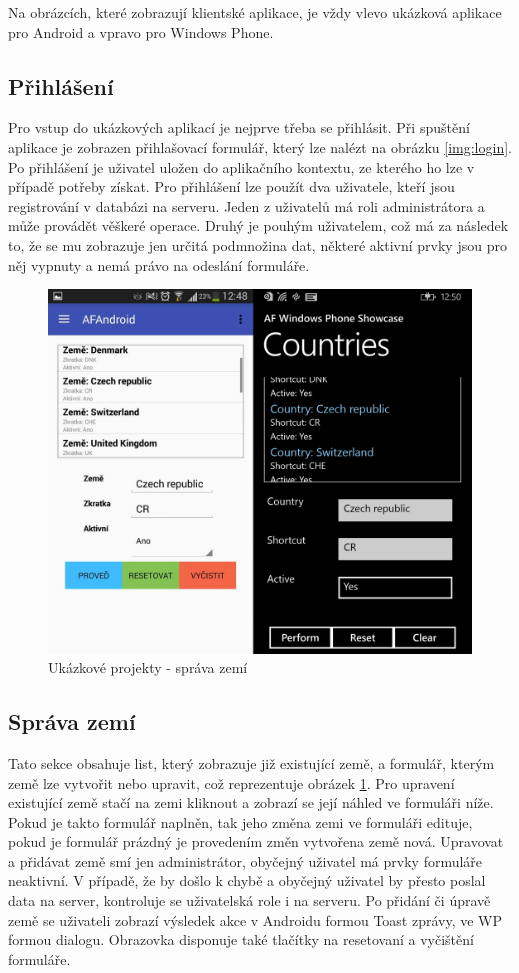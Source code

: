 Na obrázcích, které zobrazují klientské aplikace, je vždy vlevo ukázková aplikace pro Android a vpravo pro Windows Phone.

\subsection{Přihlášení}
Pro vstup do ukázkových aplikací je nejprve třeba se přihlásit. Při spuštění aplikace je zobrazen přihlašovací formulář, který lze nalézt na obrázku \ref{img:login}. Po přihlášení je uživatel uložen do aplikačního kontextu, ze kterého ho lze v případě potřeby získat. Pro přihlášení lze použít dva uživatele, kteří jsou registrování v databázi na serveru. Jeden z uživatelů má roli administrátora a může provádět věškeré operace. Druhý je pouhým uživatelem, což má za následek to, že se mu zobrazuje jen určitá podmnožina dat, některé aktivní prvky jsou pro něj vypnuty a nemá právo na odeslání formuláře.

\begin{figure}[h!]
\centering
\includegraphics[width=0.5\linewidth]{figures/screenshots/Countries}
\caption{Ukázkové projekty - správa zemí}  
\label{img:country}
\end{figure}

\subsection{Správa zemí}
Tato sekce obsahuje list, který zobrazuje již existující země, a formulář, kterým země lze vytvořit nebo upravit, což reprezentuje obrázek \ref{img:country}. Pro upravení existující země stačí na zemi kliknout a zobrazí se její náhled ve formuláři níže. Pokud je takto formulář naplněn, tak jeho změna zemi ve formuláři edituje, pokud je formulář prázdný je provedením změn vytvořena země nová. Upravovat a přidávat země smí jen administrátor, obyčejný uživatel má prvky formuláře neaktivní. V případě, že by došlo k chybě a obyčejný uživatel by přesto poslal data na server, kontroluje se uživatelská role i na serveru. Po přidání či úpravě země se uživateli zobrazí výsledek akce v Androidu formou Toast zprávy, ve WP formou dialogu. Obrazovka disponuje také tlačítky na resetovaní a vyčištění formuláře.

